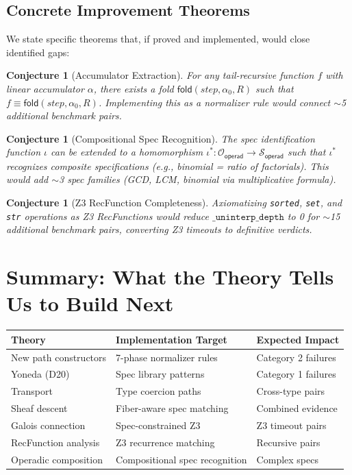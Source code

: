 \documentclass[11pt,a4paper]{report}
\theoremstyle{definition}
\theoremstyle{plain}
\newtheorem{conjecture}[definition]{Conjecture}
\newcommand{\fold}{\mathsf{fold}}
\begin{document}
\subsection{Concrete Improvement Theorems}

We state specific theorems that, if proved and implemented,
would close identified gaps:

\begin{conjecture}[Accumulator Extraction]
\label{conj:accumulator}
For any tail-recursive function $f$ with linear accumulator
$\alpha$, there exists a fold $\fold(\mathit{step}, \alpha_0, R)$
such that $f \equiv \fold(\mathit{step}, \alpha_0, R)$.
Implementing this as a normalizer rule would connect
$\sim$5 additional benchmark pairs.
\end{conjecture}

\begin{conjecture}[Compositional Spec Recognition]
\label{conj:comp-spec}
The spec identification function $\iota$ can be extended to a
homomorphism $\iota^* : \mathcal{O}_{\mathsf{operad}} \to
\mathcal{S}_{\mathsf{operad}}$ such that $\iota^*$ recognizes
composite specifications (e.g., binomial = ratio of factorials).
This would add $\sim$3 spec families (GCD, LCM, binomial via
multiplicative formula).
\end{conjecture}

\begin{conjecture}[Z3 RecFunction Completeness]
\label{conj:z3-complete}
Axiomatizing \texttt{sorted}, \texttt{set}, and \texttt{str}
operations as Z3 RecFunctions would reduce
$\texttt{\_uninterp\_depth}$ to 0 for $\sim$15 additional
benchmark pairs, converting Z3 timeouts to definitive verdicts.
\end{conjecture}


\section{Summary: What the Theory Tells Us to Build Next}
\label{sec:fallback-summary}

\begin{center}
\begin{tabular}{lll}
\hline
\textbf{Theory} & \textbf{Implementation Target} & \textbf{Expected Impact} \\
\hline
New path constructors & 7-phase normalizer rules & Category 2 failures \\
Yoneda (D20) & Spec library patterns & Category 1 failures \\
Transport & Type coercion paths & Cross-type pairs \\
Sheaf descent & Fiber-aware spec matching & Combined evidence \\
Galois connection & Spec-constrained Z3 & Z3 timeout pairs \\
RecFunction analysis & Z3 recurrence matching & Recursive pairs \\
Operadic composition & Compositional spec recognition & Complex specs \\
\hline
\end{tabular}
\end{center}
\end{document}
